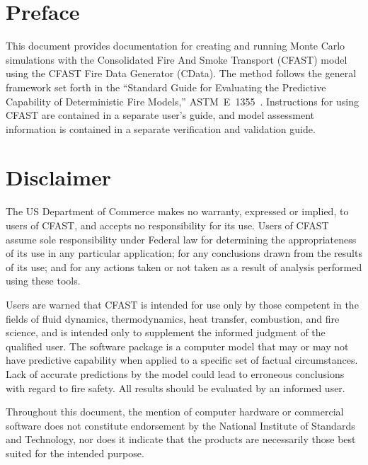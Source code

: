 \documentclass[12pt,twoside]{book}
\begin{document}
\newpage

\frontmatter

\pagestyle{plain}
\setcounter{page}{3}

%
%

\chapter{Preface}

This document provides documentation for creating and running Monte Carlo simulations with the Consolidated Fire And Smoke Transport (CFAST) model using the CFAST Fire Data Generator (CData). The method follows the general framework set forth in the ``Standard Guide for Evaluating the Predictive Capability of Deterministic Fire Models,'' ASTM~E~1355~\cite{CFAST:ASTM:E1355}. Instructions for using CFAST are contained in a separate user's guide, and model assessment information is contained in a separate verification and validation guide.

%
%

\chapter{Disclaimer}

The US Department of Commerce makes no warranty, expressed or implied, to users of CFAST, and accepts no responsibility for its use. Users of CFAST assume sole responsibility under Federal law for determining the appropriateness of its use in any particular application; for any conclusions drawn from the results of its use; and for any actions taken or not taken as a result of analysis performed using these tools.

Users are warned that CFAST is intended for use only by those competent in the fields of fluid dynamics, thermodynamics, heat transfer, combustion, and fire science, and is intended only to supplement the informed judgment of the qualified user. The software package is a computer model that may or may not have predictive capability when applied to a specific set of factual circumstances. Lack of accurate predictions by the model could lead to erroneous conclusions with regard to fire safety. All results should be evaluated by an informed user.

Throughout this document, the mention of computer hardware or commercial software does not constitute endorsement by the National Institute of Standards and Technology, nor does it indicate that the products are necessarily those best suited for the intended purpose.
\end{document}
